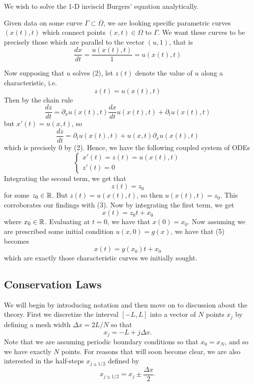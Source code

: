\documentclass{myproject}
\begin{document}
We wish to solve the 1-D inviscid Burgers' equation analytically.

Given data on some curve $ \Gamma \subset \overline{\Omega} $, we are looking specific parametric curves $ (x(t), t) $ which connect points $(x, t) \in \Omega$ to $ \Gamma $. We want these curves to be precisely those which are parallel to the vector $(u, 1)$, that is
\[
    \frac{dx}{dt} = \frac{u(x(t), t)}{1} = u(x(t), t)
\]

Now supposing that $u$ solves (2), let $z(t)$ denote the value of $u$ along a characteristic, i.e. 
\[
    z(t) = u(x(t), t)
\]
Then by the chain rule
\[
    \frac{dz}{dt} = \partial_x u(x(t), t) \frac{dx}{dt}u(x(t), t) + \partial_t u(x(t), t)
\]
but $ x'(t) = u(x,t) $, so
\[
    \frac{dz}{dt} = \partial_t u(x(t), t) + u(x,t)\partial_x u(x(t), t)
\]
which is precisely 0 by (2). Hence, we have the following coupled system of ODEs
\begin{equation}
    \begin{cases}
        x'(t) = z(t) = u(x(t), t) \\
        z'(t) = 0
    \end{cases}
\end{equation}
Integrating the second term, we get that
\[
    z(t) = z_0
\]
for some $ z_0 \in \operatorname{\mathbb{R}} $. But $z(t) = u(x(t), t)$, so then $u(x(t), t) = z_0$. This corroborates our findings with (3). Now by integrating the first term, we get
\begin{equation}
    x(t) = z_0t + x_0
\end{equation}
where $ x_0 \in \operatorname{\mathbb{R}} $. Evaluating at $t=0$, we have that $x(0) = x_0$. Now assuming we are prescribed some initial condition $u(x,0) = g(x)$, we have that (5) becomes
\begin{equation}
    x(t) = g(x_0)t + x_0
\end{equation}
which are exactly those characteristic curves we initially sought.

\subsection{Conservation Laws}
We will begin by introducing notation and then move on to discussion about the theory. First we discretize the interval $[-L,L]$ into a vector of $N$ points $x_j$ by defining a mesh width $\Delta x = 2L/N$ so that 
\[
    x_j = -L + j\Delta x.
\]
Note that we are assuming periodic boundary conditions so that $x_0 = x_{N}$, and so we have exactly $N$ points. For reasons that will soon become clear, we are also interested in the half-steps $x_{j\pm1/2}$ defined by
\[
    x_{j\pm1/2} = x_j \pm \frac{\Delta x}{2}.
\]
\end{document}
